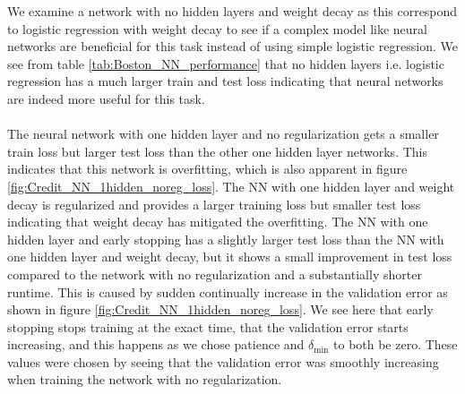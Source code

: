 \begin{table} 
\caption{Performance measurement for neural network models on Boston Housing data. Early stopping ran 194 epochs. The Python code used to implement these neural networks can be seen in appendix \ref{app:Credit_NN}.}
\label{tab:credit_NN_performance}
\end{table}
\noindent
We examine a network with no hidden layers and weight decay as this correspond to logistic regression with weight decay to see if a complex model like neural networks are beneficial for this task instead of using simple logistic regression. We see from table \ref{tab:Boston_NN_performance} that no hidden layers i.e. logistic regression has a much larger train and test loss indicating that neural networks are indeed more useful for this task. 
\\
\\
The neural network with one hidden layer and no regularization gets a smaller train loss but larger test loss than the other one hidden layer networks. This indicates that this network is overfitting, which is also apparent in figure \ref{fig:Credit_NN_1hidden_noreg_loss}. The NN with one hidden layer and weight decay is regularized and provides a larger training loss but smaller test loss indicating that weight decay has mitigated the overfitting. The NN with one hidden layer and early stopping has a slightly larger test loss than the NN with one hidden layer and weight decay, but it shows a small improvement in test loss compared to the network with no regularization and a substantially shorter runtime. This is caused by sudden continually increase in the validation error as shown in figure \ref{fig:Credit_NN_1hidden_noreg_loss}. We see here that early stopping stops training at the exact time, that the validation error starts increasing, and this happens as we chose patience and $\delta_{\text{min}}$ to both be zero. These values were chosen by seeing that the validation error was smoothly increasing when training the network with no regularization. 

